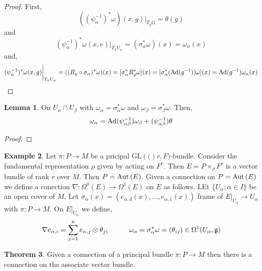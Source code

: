 \documentclass[12pt]{extarticle}
\theoremstyle{definition}
\newtheorem{theorem}{Theorem}[section]
\newtheorem{lemma}[theorem]{Lemma}
\newtheorem{example}[theorem]{Example}
\newcommand{\GL}[1]{\mathrm{GL}\left(#1\right)}
\begin{document}
\begin{proof}
First,
\[ ((\psi_\alpha^{-1})^* \omega)(x,g) \bigg|_{T_g G} = \theta(g) \]
and
\[ (\psi^{-1}_\alpha)^* \omega(x,e) \bigg|_{T_x U_\alpha} = (\sigma_\alpha^* \omega)(x) = \omega_\alpha(x) \]
and,
\[ (\psi_\alpha^{-1})^* \omega(x, g) \bigg|_{T_x U_\alpha} = ((R_g \circ \sigma_\alpha)^* \omega)(x) = [\sigma_\alpha^* R_g^* \omega](x) = [\sigma_\alpha^*(\mathrm{Ad}{(g^{-1})}) \omega](x) = \mathrm{Ad}{(g^{-1})} \omega_\alpha(x) \]
\end{proof}

\begin{lemma}
On $U_\alpha \cap U_\beta$ with $\omega_\alpha = \sigma_\alpha^* \omega$ and $\omega_\beta = \sigma_\beta^* \omega$. Then,
\[ \omega_\alpha = \mathrm{Ad}{(\psi^{-1}_{\alpha \beta})} \omega_\beta + (\psi^{-1}_{\alpha \beta}) \theta \]
\end{lemma}

\begin{proof}

\end{proof}

\begin{example}
Let $\pi : P \to M$ be a pricipal $\GL(r, F)$-bundle. Consider the fundamental representation $\rho$ given by acting on $F^r$. Then $E = P \times_\rho F^r$ is a vector bundle of rank $r$ over $M$. Then $P = \mathrm{Aut}\left( E \right)$. Given a connection on $P = \mathrm{Aut}\left( E \right)$ we define a conection $\nabla : \Omega^0(E) \to \Omega^1(E)$ on $E$ as follows. LEt $\{ U_\alpha : \alpha \in I \}$ be an open cover of $M$. Let $\sigma_\alpha(x) = (e_{\alpha, d}(x), \dots, e_{\alpha, 1}(x))$ frame of $E|_{U_\alpha} \to U_\alpha$ with $\pi : P \to M$. On $E|_{U_\alpha}$ we define,
\[ \nabla e_{\alpha,i} = \sum_{j = 1}^n e_{\alpha, j} \otimes \theta_{ji} \quad \quad \quad \omega_\alpha = \sigma_\alpha^* \omega = (\theta_{ij}) \in \Omega^1(U_\alpha, \mathfrak{g}) \] 
\end{example}

\begin{theorem}
Given a connection of a principal bundle $\pi : P \to M$ then there is a connection on the associate vector bundle. 
\end{theorem}
\end{document}
